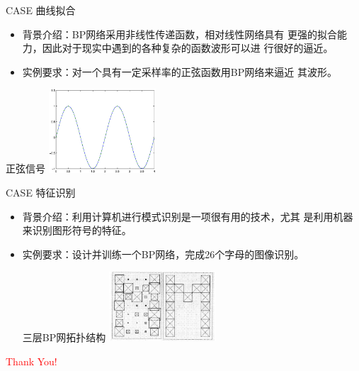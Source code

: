 \documentclass[xcolor=svgnames]{beamer}
\begin{document}
\begin{frame}{CASE  曲线拟合}
  \begin{itemize}
  \item 背景介绍：BP网络采用非线性传递函数，相对线性网络具有%
    更强的拟合能力，因此对于现实中遇到的各种复杂的函数波形可以进%
    行很好的逼近。
  \item 实例要求：对一个具有一定采样率的正弦函数用BP网络来逼近%
    其波形。
  \end{itemize}
  \begin{exampleblock}{正弦信号}
    \centering
    \includegraphics[width=4cm]{fig12.eps}
  \end{exampleblock}
\end{frame}

\begin{frame}{CASE  特征识别}
  \begin{itemize}
  \item 背景介绍：利用计算机进行模式识别是一项很有用的技术，尤其%
    是利用机器来识别图形符号的特征。
  \item 实例要求：设计并训练一个BP网络，完成26个字母的图像识别。
    \begin{exampleblock}{三层BP网拓扑结构}
      \centering
      \includegraphics[width=4cm]{fig13.png}
    \end{exampleblock}
  \end{itemize}
\end{frame}


\begin{frame}
  \begin{center}
    \Huge{\textcolor{red}{Thank You!}}
  \end{center}
\end{frame}
\end{document}
